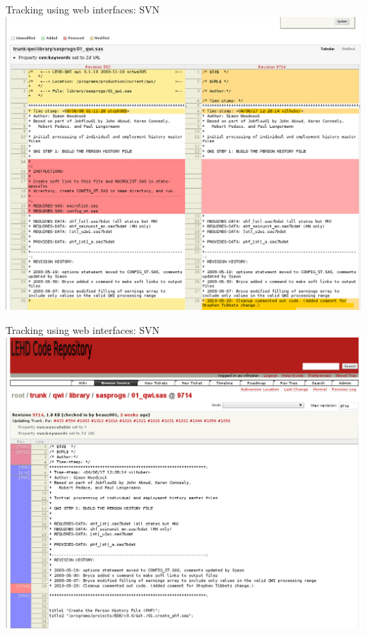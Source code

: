 \documentclass[xcolor=table,compress]{beamer}
\begin{document}
\begin{frame}{Tracking using web interfaces: SVN}
\includegraphics[width=.9\textwidth]{trac-svn-view3.png}
\end{frame}

\begin{frame}{Tracking using web interfaces: SVN}
\includegraphics[width=.9\textwidth]{trac-svn-view4.png}
\end{frame}
\end{document}
